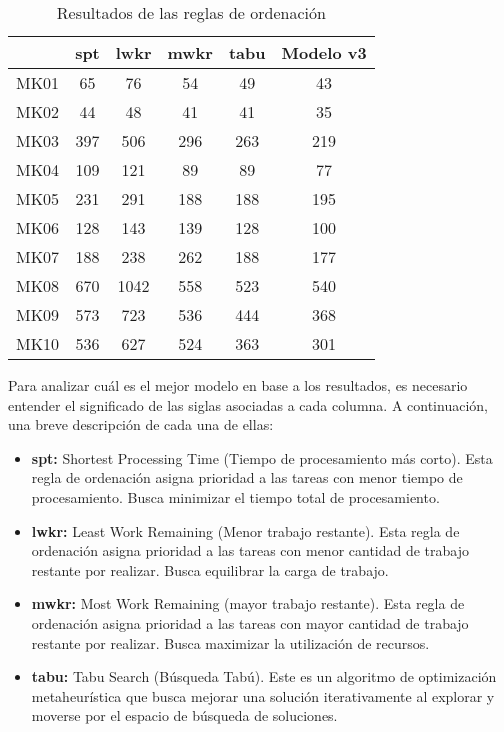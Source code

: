 \begin{table}[ht]
    \centering
    \begin{tabular}[ht]{|l|ccccc|}
        \hline
                  & spt & lwkr & mwkr & tabu & Modelo v3\\
        \hline
        MK01      & 65      & 76    & 54    & 49   & 43  \\
        MK02      & 44      & 48    & 41    & 41   & 35  \\
        MK03      & 397     & 506   & 296   & 263  & 219 \\
        MK04      & 109     & 121   & 89    & 89   & 77  \\
        MK05      & 231     & 291   & 188   & 188  & 195 \\
        MK06      & 128     & 143   & 139   & 128  & 100 \\
        MK07      & 188     & 238   & 262   & 188  & 177 \\
        MK08      & 670     & 1042  & 558   & 523  & 540 \\
        MK09      & 573     & 723   & 536   & 444  & 368 \\
        MK10      & 536     & 627   & 524   & 363  & 301 \\
        \hline
    \end{tabular}
    \caption{Resultados de las reglas de ordenación}
\end{table}

Para analizar cuál es el mejor modelo en base a los resultados, 
es necesario entender el significado de las siglas asociadas a cada 
columna. A continuación, una breve descripción de cada una de ellas:
\begin{itemize}
    \item \textbf{spt:} Shortest Processing Time (Tiempo de procesamiento 
    más corto). Esta regla de ordenación asigna prioridad a las tareas con 
    menor tiempo de procesamiento. Busca minimizar el tiempo total de procesamiento.
    \item \textbf{lwkr:} Least Work Remaining (Menor trabajo restante). Esta 
    regla de ordenación asigna prioridad a las tareas con menor cantidad de trabajo 
    restante por realizar. Busca equilibrar la carga de trabajo.
    \item \textbf{mwkr:} Most Work Remaining (mayor trabajo restante). Esta regla 
    de ordenación asigna prioridad a las tareas con mayor cantidad de trabajo restante 
    por realizar. Busca maximizar la utilización de recursos.
    \item \textbf{tabu:} Tabu Search (Búsqueda Tabú). Este es un algoritmo de optimización 
    metaheurística que busca mejorar una solución iterativamente al explorar y moverse por 
    el espacio de búsqueda de soluciones. 
\end{itemize}

